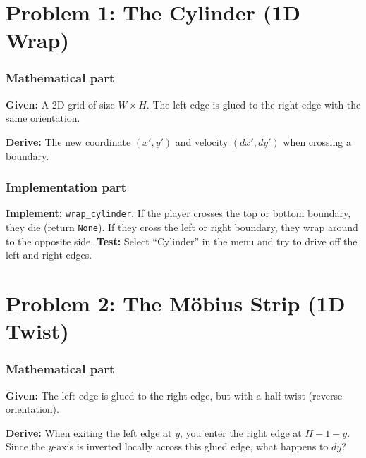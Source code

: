 \documentclass[11pt]{article}
\begin{document}
\newpage

\section*{Problem 1: The Cylinder (1D Wrap)}

\subsubsection*{Mathematical part}
\textbf{Given:} A 2D grid of size $W \times H$. The left edge is glued to the right edge with the same orientation.
\begin{center}
\end{center}
\textbf{Derive:} The new coordinate $(x', y')$ and velocity $(dx', dy')$ when crossing a boundary.

\subsubsection*{Implementation part}
\textbf{Implement:} \lstinline|wrap_cylinder|. If the player crosses the top or bottom boundary, they die (return \lstinline|None|). If they cross the left or right boundary, they wrap around to the opposite side.
\textbf{Test:} Select ``Cylinder'' in the menu and try to drive off the left and right edges.


\section*{Problem 2: The Möbius Strip (1D Twist)}

\subsubsection*{Mathematical part}
\textbf{Given:} The left edge is glued to the right edge, but with a half-twist (reverse orientation).
\begin{center}
\end{center}
\textbf{Derive:} When exiting the left edge at $y$, you enter the right edge at $H - 1 - y$. Since the $y$-axis is inverted locally across this glued edge, what happens to $dy$?
\end{document}
